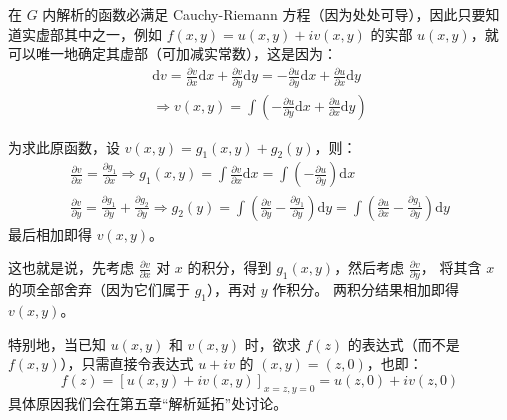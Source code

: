\documentclass[UTF8]{report}
\theoremstyle{MyLineTheoremStyle} %
\theoremstyle{MyBlockTheoremStyle} %
\theoremstyle{MySubsubsectionStyle} %
\begin{document}
在 $G$ 内解析的函数必满足 Cauchy-Riemann 方程（因为处处可导），因此只要知道实虚部其中之一，例如 $f(x,y) = u(x,y) + iv(x,y)$ 的实部 $u(x,y)$，就可以唯一地确定其虚部（可加减实常数），这是因为：
\begin{gather}
\mathrm{d} v = \frac{\partial v }{\partial x }\mathrm{d}x + \frac{\partial v }{\partial y } \mathrm{d}y = - \frac{\partial u}{\partial y } \mathrm{d}x + \frac{\partial u}{\partial x } \mathrm{d}y \\ \Longrightarrow
v(x,y) = \int \left( - \frac{\partial u}{\partial y } \mathrm{d}x + \frac{\partial u}{\partial x } \mathrm{d}y  \right)
\end{gather}


为求此原函数，设 $v(x,y) = g_1(x,y) + g_2(y)$，则：
\begin{gather}
\frac{\partial v }{\partial x} = \frac{\partial g_1 }{\partial x } 
\Longrightarrow 
g_1(x,y) = \int \frac{\partial v }{\partial x } \mathrm{d} x = \int (- \frac{\partial u }{\partial y }) \mathrm{d}x
\\ 
\frac{\partial v }{\partial y } = \frac{\partial g_1 }{\partial y } + \frac{\partial g_2 }{\partial y } \Longrightarrow 
g_2(y) = \int (\frac{\partial v }{\partial y } - \frac{\partial g_1 }{\partial y }) \mathrm{d}y = \int (\frac{\partial u }{\partial x } - \frac{\partial g_1 }{\partial y }) \mathrm{d}y 
\end{gather}
最后相加即得 $v(x,y)$。

这也就是说，先考虑 $\frac{\partial v }{\partial x }$ 对 $x$ 的积分，得到 $g_1(x,y)$，然后考虑 $\frac{\partial v }{\partial y }$，{\color{red} 将其含 $x$ 的项全部舍弃}（因为它们属于 $g_1$），再对 $y$ 作积分。{\color{red} 两积分结果相加即得 $v(x,y)$。}

特别地，当已知 $u(x,y)$ 和 $v(x,y)$ 时，欲求 $f(z)$ 的表达式（而不是 $f(x,y)$），只需直接令表达式 $u + iv$ 的 $(x,y) = (z,0)$，也即： 
\begin{equation}
\boxed{
    {f(z) = \left[u(x,y) + iv(x,y)\right]_{x = z, y=0} = u(z,0) + iv(z,0)}
}
\end{equation}
具体原因我们会在第五章“解析延拓”处讨论。
\end{document}
